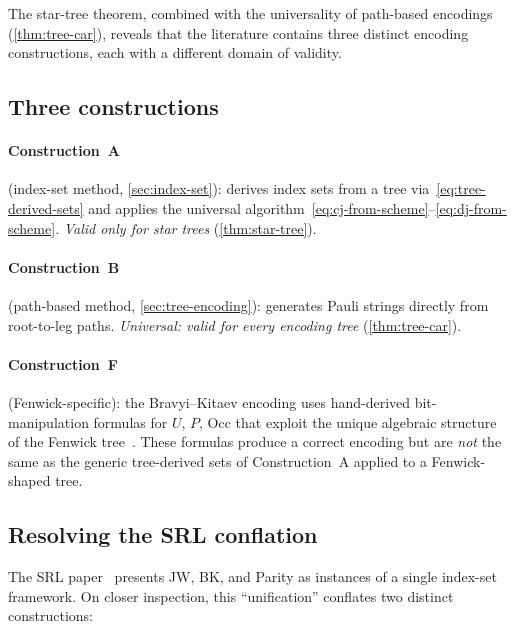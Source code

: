 %

The star-tree theorem, combined with the universality of path-based
encodings (\cref{thm:tree-car}), reveals that the literature contains
three distinct encoding constructions, each with a different domain of
validity.

\subsection{Three constructions}

\paragraph{Construction~A} (index-set method, \cref{sec:index-set}):
derives index sets from a tree via~\eqref{eq:tree-derived-sets}
and applies the universal
algorithm~\eqref{eq:cj-from-scheme}--\eqref{eq:dj-from-scheme}.
\emph{Valid only for star trees} (\cref{thm:star-tree}).

\paragraph{Construction~B} (path-based method,
\cref{sec:tree-encoding}): generates Pauli strings directly from
root-to-leg paths.  \emph{Universal: valid for every encoding tree}
(\cref{thm:tree-car}).

\paragraph{Construction~F} (Fenwick-specific): the Bravyi--Kitaev
encoding uses hand-derived bit-manipulation formulas for $U$, $P$,
$\mathrm{Occ}$ that exploit the unique algebraic structure of the
Fenwick tree~\cite{fenwick1994}.  These formulas produce a correct
encoding but are \emph{not} the same as the generic tree-derived
sets of Construction~A applied to a Fenwick-shaped tree.

\subsection{Resolving the SRL conflation}

The SRL paper~\cite{seeley2012} presents JW, BK, and Parity as
instances of a single index-set framework.  On closer inspection,
this ``unification'' conflates two distinct constructions:

